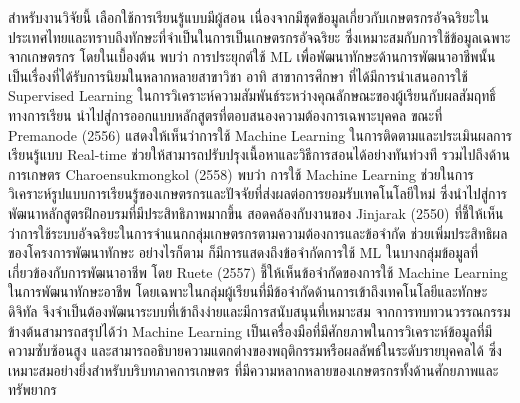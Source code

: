 สำหรับงานวิจัยนี้ เลือกใช้การเรียนรู้แบบมีผู้สอน เนื่องจากมีชุดข้อมูลเกี่ยวกับเกษตรกรอัจฉริยะในประเทศไทยและทราบถึงทักษะที่จำเป็นในการเป็นเกษตรกรอัจฉริยะ ซึ่งเหมาะสมกับการใช้ข้อมูลเฉพาะจากเกษตรกร โดยในเบื้องต้น พบว่า การประยุกต์ใช้ ML เพื่อพัฒนาทักษะด้านการพัฒนาอาชีพนั้น เป็นเรื่องที่ได้รับการนิยมในหลากหลายสาขาวิชา อาทิ สาขาการศึกษา ที่ได้มีการนำเสนอการใช้ Supervised Learning ในการวิเคราะห์ความสัมพันธ์ระหว่างคุณลักษณะของผู้เรียนกับผลสัมฤทธิ์ทางการเรียน นำไปสู่การออกแบบหลักสูตรที่ตอบสนองความต้องการเฉพาะบุคคล ขณะที่ Premanode (2556) แสดงให้เห็นว่าการใช้ Machine Learning ในการติดตามและประเมินผลการเรียนรู้แบบ Real-time ช่วยให้สามารถปรับปรุงเนื้อหาและวิธีการสอนได้อย่างทันท่วงที รวมไปถึงด้านการเกษตร Charoensukmongkol (2558) พบว่า การใช้ Machine Learning ช่วยในการวิเคราะห์รูปแบบการเรียนรู้ของเกษตรกรและปัจจัยที่ส่งผลต่อการยอมรับเทคโนโลยีใหม่ ซึ่งนำไปสู่การพัฒนาหลักสูตรฝึกอบรมที่มีประสิทธิภาพมากขึ้น สอดคล้องกับงานของ Jinjarak (2550) ที่ชี้ให้เห็นว่าการใช้ระบบอัจฉริยะในการจำแนกกลุ่มเกษตรกรตามความต้องการและข้อจำกัด ช่วยเพิ่มประสิทธิผลของโครงการพัฒนาทักษะ อย่างไรก็ตาม ก็มีการแสดงถึงข้อจำกัดการใช้ ML ในบางกลุ่มข้อมูลที่เกี่ยวข้องกับการพัฒนาอาชีพ โดย Ruete (2557) ชี้ให้เห็นข้อจำกัดของการใช้ Machine Learning ในการพัฒนาทักษะอาชีพ โดยเฉพาะในกลุ่มผู้เรียนที่มีข้อจำกัดด้านการเข้าถึงเทคโนโลยีและทักษะดิจิทัล จึงจำเป็นต้องพัฒนาระบบที่เข้าถึงง่ายและมีการสนับสนุนที่เหมาะสม
จากการทบทวนวรรณกรรมข้างต้นสามารถสรุปได้ว่า Machine Learning เป็นเครื่องมือที่มีศักยภาพในการวิเคราะห์ข้อมูลที่มีความซับซ้อนสูง และสามารถอธิบายความแตกต่างของพฤติกรรมหรือผลลัพธ์ในระดับรายบุคคลได้ ซึ่งเหมาะสมอย่างยิ่งสำหรับบริบทภาคการเกษตร ที่มีความหลากหลายของเกษตรกรทั้งด้านศักยภาพและทรัพยากร
